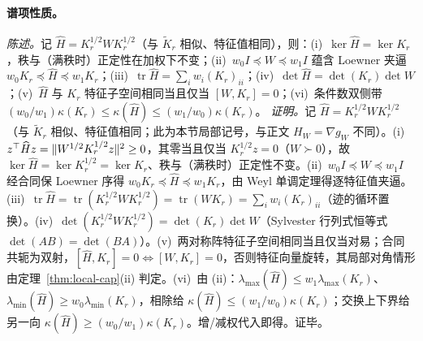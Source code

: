 \documentclass[fontset=windows,11pt]{ctexart}
\DeclarePairedDelimiter{\norm}{\lVert}{\rVert}
\newcommand{\W}{W}
\DeclareMathOperator{\tr}{tr}
\numberwithin{equation}{section}
\begin{document}
\paragraph{谱项性质。}
\emph{陈述。}记 $\widehat H=K_r^{1/2}\W K_r^{1/2}$（与 $\widetilde K_r$ 相似、特征值相同），则：(i)~$\ker\widehat H=\ker K_r$，秩与（满秩时）正定性在加权下不变；(ii)~$w_0I\preceq\W\preceq w_1I$ 蕴含 Loewner 夹逼 $w_0K_r\preceq\widehat H\preceq w_1K_r$；(iii)~$\tr\widehat H=\sum_iw_i(K_r)_{ii}$；(iv)~$\det\widehat H=\det(K_r)\det\W$；(v)~$\widehat H$ 与 $K_r$ 特征子空间相同当且仅当 $[\W,K_r]=0$；(vi)~条件数双侧带 $(w_0/w_1)\kappa(K_r)\le\kappa(\widehat H)\le(w_1/w_0)\kappa(K_r)$。
\emph{证明。}记 $\widehat H=K_r^{1/2}\W K_r^{1/2}$（与 $\widetilde K_r$ 相似、特征值相同；此为本节局部记号，与正文 $H_\W=\nabla g_\W$ 不同）。(i)~$z^\top\widehat Hz=\norm{\W^{1/2}K_r^{1/2}z}^2\ge0$，其零当且仅当 $K_r^{1/2}z=0$（$\W\succ0$），故 $\ker\widehat H=\ker K_r^{1/2}=\ker K_r$、秩与（满秩时）正定性不变。(ii)~$w_0I\preceq\W\preceq w_1I$ 经合同保 Loewner 序得 $w_0K_r\preceq\widehat H\preceq w_1K_r$，由 Weyl 单调定理得逐特征值夹逼。(iii)~$\tr\widehat H=\tr(K_r^{1/2}\W K_r^{1/2})=\tr(\W K_r)=\sum_iw_i(K_r)_{ii}$（迹的循环置换）。(iv)~$\det(K_r^{1/2}\W K_r^{1/2})=\det(K_r)\det\W$（Sylvester 行列式恒等式 $\det(AB)=\det(BA)$）。(v)~两对称阵特征子空间相同当且仅当对易；合同共轭为双射，$[\widehat H,K_r]=0\iff[\W,K_r]=0$，否则特征向量旋转，其局部对角情形由定理~\ref{thm:local-cap}(ii) 判定。(vi)~由 (ii)：$\lambda_{\max}(\widehat H)\le w_1\lambda_{\max}(K_r)$、$\lambda_{\min}(\widehat H)\ge w_0\lambda_{\min}(K_r)$，相除给 $\kappa(\widehat H)\le(w_1/w_0)\kappa(K_r)$；交换上下界给另一向 $\kappa(\widehat H)\ge(w_0/w_1)\kappa(K_r)$。增/减权代入即得。证毕。
\end{document}
